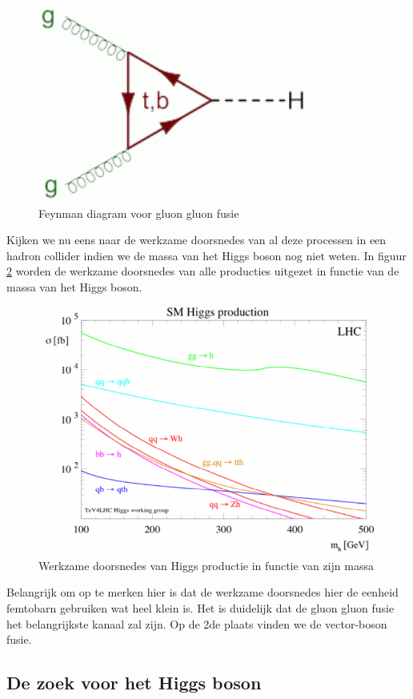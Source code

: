 \documentclass[../main.tex]{subfiles}
\begin{document}
\begin{figure}[h]
    \centering
    \includegraphics[width=0.5\linewidth]{higgs_boson/gluon_gluon_fusie.png}
    \caption{Feynman diagram voor gluon gluon fusie}%
    \label{fig:higgs_boson/gluon_gluon_fusie}
\end{figure}

Kijken we nu eens naar de werkzame doorsnedes van al deze processen in een hadron collider indien we de massa van het Higgs boson nog niet weten. In figuur \ref{fig:higgs_boson/h_prod_lhc} worden de werkzame doorsnedes van alle producties uitgezet in functie van de massa van het Higgs boson.

\begin{figure}[h]
    \centering
    \includegraphics[width=0.6\linewidth]{higgs_boson/h_prod_lhc.png}
    \caption{Werkzame doorsnedes van Higgs productie in functie van zijn massa}%
    \label{fig:higgs_boson/h_prod_lhc}
\end{figure}

Belangrijk om op te merken hier is dat de werkzame doorsnedes hier de eenheid femtobarn gebruiken wat heel klein is. Het is duidelijk dat de gluon gluon fusie het belangrijkste kanaal zal zijn. Op de 2de plaats vinden we de vector-boson fusie.

\subsection{De zoek voor het Higgs boson}%
\label{sub:de_zoek_voor_het_higgs_boson}
\end{document}
